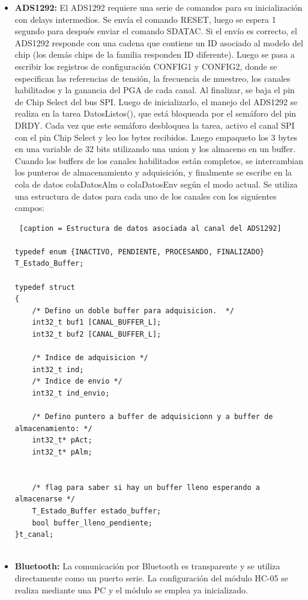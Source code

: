 \begin{itemize}

 	\item \textbf{ADS1292:} El ADS1292 requiere una serie de comandos para su inicialización\cite{texas2012} con delays intermedios. Se envía el comando RESET, luego se espera 1 segundo para después enviar el comando SDATAC. Si el envío es correcto, el ADS1292 responde con una cadena que contiene un ID asociado al modelo del chip (los demás chips de la familia responden ID diferente). 
 	Luego se pasa a escribir los registros de configuración CONFIG1 y CONFIG2, donde se especifican las referencias de tensión, la frecuencia de muestreo, los canales habilitados y la ganancia del PGA de cada canal. Al finalizar, se baja el pin de Chip Select del bus SPI. 
 	Luego de inicializarlo, el manejo del ADS1292 se realiza en la tarea DatosListos(), que está bloqueada por el semáforo del pin DRDY. Cada vez que este semáforo desbloquea la tarea, activo el canal SPI con el pin Chip Select y leo los bytes recibidos. Luego empaqueto los 3 bytes en una variable de 32 bits utilizando una union y los almaceno en un buffer. Cuando los buffers de los canales habilitados están completos, se intercambian los punteros de almacenamiento y adquisición, y finalmente se escribe en la cola de datos colaDatosAlm o colaDatosEnv según el modo actual.
 	Se utiliza una estructura de datos para cada uno de los canales con los siguientes campos:
 	
\footnotesize 	
\begin{lstlisting} [caption = Estructura de datos asociada al canal del ADS1292]

typedef enum {INACTIVO, PENDIENTE, PROCESANDO, FINALIZADO} T_Estado_Buffer;

typedef struct
{
	/* Defino un doble buffer para adquisicion.  */
	int32_t buf1 [CANAL_BUFFER_L];
	int32_t buf2 [CANAL_BUFFER_L];

	/* Indice de adquisicion */
	int32_t ind;
	/* Indice de envio */
	int32_t ind_envio;

	/* Defino puntero a buffer de adquisicionn y a buffer de almacenamiento: */
	int32_t* pAct;
	int32_t* pAlm;


	/* flag para saber si hay un buffer lleno esperando a almacenarse */
	T_Estado_Buffer estado_buffer;
	bool buffer_lleno_pendiente;
}t_canal;


\end{lstlisting}	
\normalsize

 	
 	\item \textbf{Bluetooth:} La comunicación por Bluetooth es transparente y se utiliza directamente como un puerto serie. La configuración del módulo HC-05 se realiza mediante una PC y el módulo se emplea ya inicializado.


\end{itemize}
